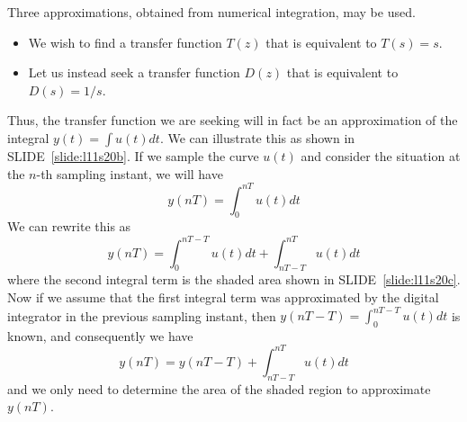 Three approximations, obtained from numerical integration, may be
used. 

\begin{slide}\label{slide:l11s20a}
  \begin{itemize}
  \item We wish to find a transfer function $T(z)$ that is equivalent to $T(s)=s$.
  \item Let us instead seek a transfer function $D(z)$ that is equivalent to $D(s) = 1/s$.
  \end{itemize}
\end{slide}

Thus, the transfer function we are seeking will in fact be an approximation of the integral $y(t)=\int u(t) dt$. We can illustrate this as shown in SLIDE~\ref{slide:l11s20b}. If we sample the curve $u(t)$ and consider the situation at the $n$-th sampling instant, we will have $$y(nT) = \int_{0}^{nT} u(t) dt$$ We can rewrite this as $$y(nT)= \int_{0}^{nT-T} u(t) dt + \int_{nT-T}^{nT} u(t) dt$$ where the second integral term is the shaded area shown in SLIDE~\ref{slide:l11s20c}. Now if we assume that the first integral term was approximated by the digital integrator in the previous sampling instant, then $y(nT-T) = \int_{0}^{nT-T} u(t) dt$ is known, and consequently we have $$y(nT) = y(nT-T) + \int_{nT-T}^{nT} u(t) dt$$ and we only need to determine the area of the shaded region to approximate $y(nT)$.

\begin{slide}\label{slide:l11s20b}
\begin{center}
\end{center}
\end{slide}

